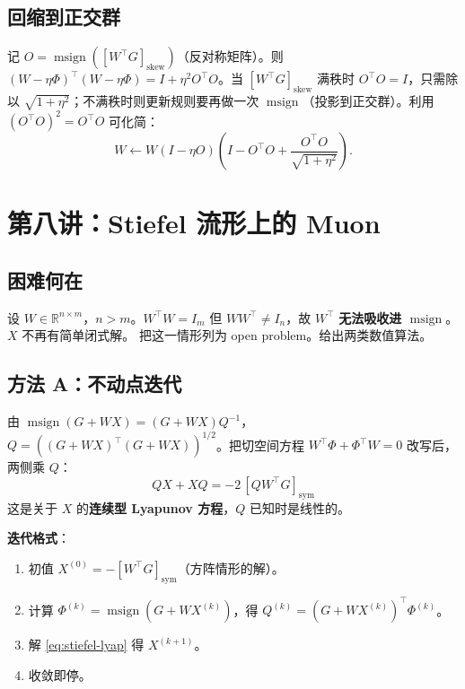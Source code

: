 \documentclass[11pt,a4paper]{article}
\theoremstyle{mythm}
\theoremstyle{mydef}
\newcommand{\R}{\mathbb{R}}
\newcommand{\msign}{\operatorname{msign}}
\begin{document}
\subsection{回缩到正交群}

记 $O = \msign([W^\top G]_{\mathrm{skew}})$（反对称矩阵）。则 $(W-\eta\Phi)^\top (W-\eta\Phi) = I + \eta^2 O^\top O$。当 $[W^\top G]_{\mathrm{skew}}$ 满秩时 $O^\top O = I$，只需除以 $\sqrt{1+\eta^2}$；不满秩时则更新规则要再做一次 $\msign$（投影到正交群）。利用 $(O^\top O)^2 = O^\top O$ 可化简：
\begin{equation}
W \leftarrow W(I-\eta O)\!\left(I - O^\top O + \frac{O^\top O}{\sqrt{1+\eta^2}}\right).
\end{equation}

\section{第八讲：Stiefel 流形上的 Muon}\label{sec:stiefel}

\subsection{困难何在}
设 $W\in\R^{n\times m}$，$n>m$。$W^\top W = I_m$ 但 $WW^\top \ne I_n$，故 $W^\top$ \textbf{无法吸收进 $\msign$}。$X$ 不再有简单闭式解。\cite{bernstein-orth} 把这一情形列为 open problem。给出两类数值算法。

\subsection{方法 A：不动点迭代}

由 $\msign(G+WX) = (G+WX)Q^{-1}$，$Q = ((G+WX)^\top(G+WX))^{1/2}$。把切空间方程 $W^\top\Phi + \Phi^\top W = 0$ 改写后，两侧乘 $Q$：
\begin{equation}\label{eq:stiefel-lyap}
\boxed{\quad QX + XQ = -2\,[Q W^\top G]_{\mathrm{sym}}\quad}
\end{equation}
这是关于 $X$ 的\textbf{连续型 Lyapunov 方程}，$Q$ 已知时是线性的。

\textbf{迭代格式}：
\begin{enumerate}[leftmargin=2em]
\item 初值 $X^{(0)} = -[W^\top G]_{\mathrm{sym}}$（方阵情形的解）。
\item 计算 $\Phi^{(k)} = \msign(G+WX^{(k)})$，得 $Q^{(k)} = (G+WX^{(k)})^\top \Phi^{(k)}$。
\item 解 \eqref{eq:stiefel-lyap} 得 $X^{(k+1)}$。
\item 收敛即停。
\end{enumerate}
\end{document}
